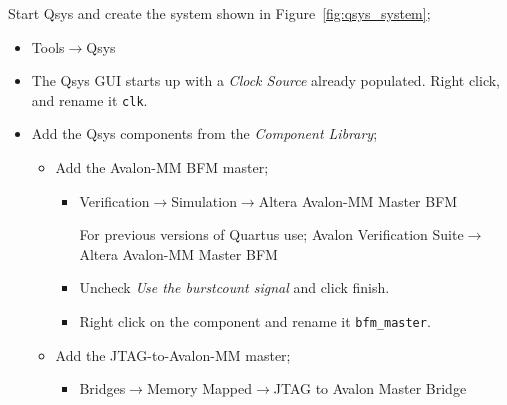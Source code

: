 \documentclass[10pt,twoside]{article}
\begin{document}
Start Qsys and create the system shown in Figure~\ref{fig:qsys_system};
%
\begin{itemize}
\item Tools$\rightarrow$Qsys
\item The Qsys GUI starts up with a {\em Clock Source} already populated.
Right click, and rename it \verb+clk+.
%
\item Add the Qsys components from the {\em Component Library};
\begin{itemize}
%
\item Add the Avalon-MM BFM master;
\begin{itemize}
\item Verification$\rightarrow$Simulation$\rightarrow$Altera Avalon-MM Master BFM

For previous versions of Quartus use;\newline
Avalon Verification Suite$\rightarrow$Altera Avalon-MM Master BFM
\item Uncheck {\em Use the burstcount signal} and click finish.
\item Right click on the component and rename it \verb+bfm_master+.
\end{itemize}
%
\item Add the JTAG-to-Avalon-MM master;
\begin{itemize}
\item Bridges$\rightarrow$Memory Mapped$\rightarrow$JTAG to Avalon Master Bridge


\end{itemize}
\end{itemize}
\end{itemize}
\end{document}
